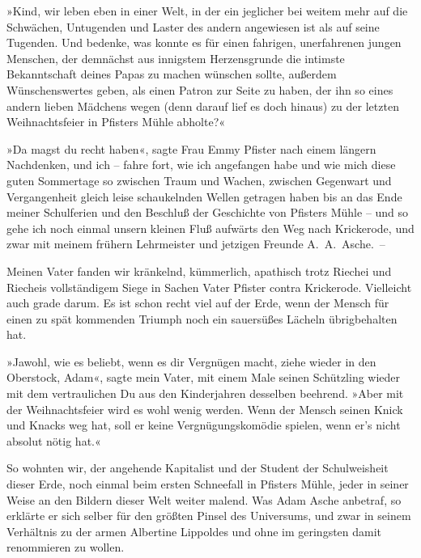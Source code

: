 »Kind, wir leben eben in einer Welt, in der ein jeglicher bei
weitem mehr auf die Schwächen, Untugenden und Laster des andern
angewiesen ist als auf seine Tugenden. Und bedenke, was konnte es
für einen fahrigen, unerfahrenen jungen Menschen, der demnächst aus
innigstem Herzensgrunde die intimste Bekanntschaft deines Papas zu
machen wünschen sollte, außerdem Wünschenswertes geben, als einen
Patron zur Seite zu haben, der ihn so eines andern lieben Mädchens
wegen (denn darauf lief es doch hinaus) zu der letzten
Weihnachtsfeier in Pfisters Mühle abholte?«

»Da magst du recht haben«, sagte Frau Emmy Pfister nach einem
längern Nachdenken, und ich – fahre fort, wie ich angefangen habe
und wie mich diese guten Sommertage so zwischen Traum und Wachen,
zwischen Gegenwart und Vergangenheit gleich leise schaukelnden
Wellen getragen haben bis an das Ende meiner Schulferien und den
Beschluß der Geschichte von Pfisters Mühle – und so gehe ich noch
einmal unsern kleinen Fluß aufwärts den Weg nach Krickerode, und
zwar mit meinem frühern Lehrmeister und jetzigen Freunde
A.~A.~Asche.~–

Meinen Vater fanden wir kränkelnd, kümmerlich, apathisch trotz
Riechei und Riecheis vollständigem Siege in Sachen Vater Pfister
contra Krickerode. Vielleicht auch grade darum. Es ist schon recht
viel auf der Erde, wenn der Mensch für einen zu spät kommenden
Triumph noch ein sauersüßes Lächeln übrigbehalten hat.

»Jawohl, wie es beliebt, wenn es dir Vergnügen macht, ziehe wieder
in den Oberstock, Adam«, sagte mein Vater, mit einem Male seinen
Schützling wieder mit dem vertraulichen Du aus den Kinderjahren
desselben beehrend. »Aber mit der Weihnachtsfeier wird es wohl
wenig werden. Wenn der Mensch seinen Knick und Knacks weg hat, soll
er keine Vergnügungskomödie spielen, wenn er's nicht absolut nötig
hat.«

So wohnten wir, der angehende Kapitalist und der Student der
Schulweisheit dieser Erde, noch einmal beim ersten Schneefall in
Pfisters Mühle, jeder in seiner Weise an den Bildern dieser Welt
weiter malend. Was Adam Asche anbetraf, so erklärte er sich selber
für den größten Pinsel des Universums, und zwar in seinem
Verhältnis zu der armen Albertine Lippoldes und ohne im geringsten
damit renommieren zu wollen.

